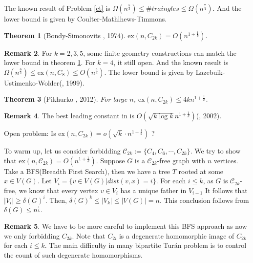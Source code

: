 \documentclass{article}
\newtheorem{theorem}{Theorem}[section]
\theoremstyle{definition}
\newtheorem{remark}[theorem]{Remark}
\newcommand{\ex}{\mathrm{ex}}
\def\Turan{Tur\'an}
\begin{document}
The known result of Problem  \ref{ct} is $\Omega(n^{\frac{5}{3}})\leq \# traingles \leq \Omega(n^{\frac{7}{4}})$. And the lower bound is given by Coulter-Mathlhews-Timmons.





\begin{theorem}[Bondy-Simonovits \cite{bondy1974cycles}, 1974] \label{bstc}
    $\ex(n,C_{2k})= O(n^{1+\frac{1}{k}}).$
\end{theorem}

\begin{remark}
    For $k=2,3,5$, some finite geometry constructions can match the lower bound in theorem \ref{bstc}. For $k=4$, it still open. And the known result is $\Omega(n^{\frac{6}{5}})\leq \ex(n,C_8)\leq O(n^\frac{5}{4})$. The lower bound is given by Lazebuik-Ustimenko-Wolder(\cite{lazebnik1999polarities}, 1999).  
\end{remark}



\begin{theorem}[Pikhurko \cite{pikhurko2012note}, 2012] \label{pt}
    For large $n$, $\ex(n,C_{2k})\leq 4kn^{1+\frac{1}{k}}$.
\end{theorem}

\begin{remark}
    The best leading constant in  is $O(\sqrt{k\log k}n^{1+\frac{1}{k}})$(\cite{thomassen2007chromatic}, 2002).
\end{remark}

Open problem: Is $\ex(n,C_{2k})=o(\sqrt{k}\cdot n^{1+\frac{1}{k}})$ ?\par

To warm up, let us consider forbidding $\mathcal{C}_{2k}:=\{C_4,C_6,\cdots,C_{2k}\}$. We try to show that $\ex(n,\mathcal{C}_{2k})=O(n^{1+\frac{1}{k}})$. Suppose $G$ is a $\mathcal{C}_{2k}$-free graph with $n$ vertices. Take a BFS(Breadth First Search), then we have a tree $T$ rooted at some $x\in V(G).$ Let $V_i=\{v\in V(G)|dist(v,x)=i\}$. For each $i\leq k$, as $G$ is $\mathcal{C}_{2k}$-free, we know that every vertex $v\in V_i$ has a unique father in $V_{i-1}$ It follows that $|V_i|\geq \delta(G)^i$. Then, $\delta(G)^k\leq |V_k|\leq|V(G)|=n$. This conclusion follows from $\delta(G)\leq n^{\frac{1}{k}}$.

\begin{remark}
    We have to be more careful to implement this BFS approach as now we only forbidding $C_{2k}$. Note that $C_{2i}$ is a degenerate homomorphic image of $C_{2k}$ for each $i\leq k$. The main difficulty in many bipartite \Turan{} problem is to control the count of such degenerate homomorphisms.
\end{remark}
\end{document}
